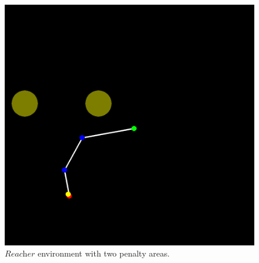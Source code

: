 \documentclass{article}
\begin{document}
\begin{figure}[htbp]
	\centering
	\includegraphics[scale=0.3]{img/ddpgfd_env.png}
	\caption{$\textit{Reacher}$ environment with two penalty areas.}
	\label{fig:ddpgfd0}
\end{figure}


\end{document}
